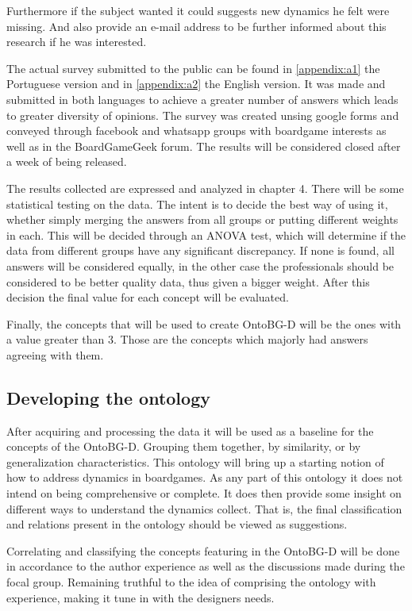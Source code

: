 Furthermore if the subject wanted it could suggests new dynamics he felt were missing. And also provide an e-mail address to be further informed about this research if he was interested. 

The actual survey submitted to the public can be found in \autoref{appendix:a1} the Portuguese version and in \autoref{appendix:a2} the English version. It was made and submitted in both languages to achieve a greater number of answers which leads to greater diversity of opinions. The survey was created unsing google forms and conveyed through facebook and whatsapp groups with boardgame interests as well as in the BoardGameGeek forum. The results will be considered closed after a week of being released.

The results collected are expressed and analyzed in chapter 4. There will be some statistical testing on the data. The intent is to decide the best way of using it, whether simply merging the answers from all groups or putting different weights in each. This will be decided through an ANOVA test, which will determine if the data from different groups have any significant discrepancy. If none is found, all answers will be considered equally, in the other case the professionals should be considered to be better quality data, thus given a bigger weight. After this decision the final value for each concept will be evaluated.

Finally, the concepts that will be used to create OntoBG-D will be the ones with a value greater than 3. Those are the concepts which majorly had answers agreeing with them.

\subsection{Developing the ontology}

After acquiring and processing the data it will be used as a baseline for the concepts of the OntoBG-D. Grouping them together, by similarity, or by generalization characteristics. This ontology will bring up a starting notion of how to address dynamics in boardgames. As any part of this ontology it does not intend on being comprehensive or complete. It does then provide some insight on different ways to understand the dynamics collect. That is, the final classification and relations present in the ontology should be viewed as suggestions.

Correlating and classifying the concepts featuring in the OntoBG-D will be done in accordance to the author experience as well as the discussions made during the focal group. Remaining truthful to the idea of comprising the ontology with experience, making it tune in with the designers needs.